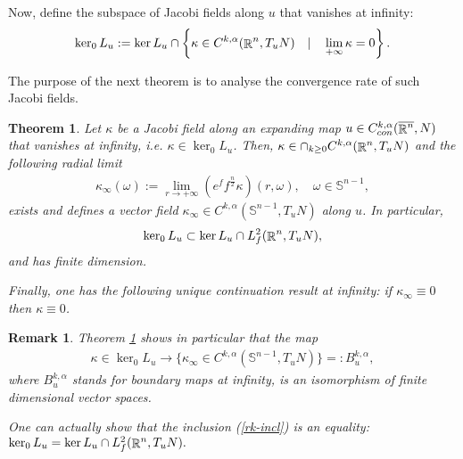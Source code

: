 \documentclass[a4paper,11pt,reqno]{amsart}
\newtheorem{theo}[defn]{Theorem}
\newtheorem{rk}[defn]{Remark}
\def\R{\mathop{\rm \mathbb{R}}\nolimits}
\newcommand{\Sp}{\mathbb{S}}
\begin{document}
 Now, define the subspace of Jacobi fields along $u$ that vanishes at infinity:
\begin{eqnarray*}
\ker_0L_u:=\ker L_u\cap \left\{\kappa\in C^{k,\alpha}(\R^n,T_uN)\quad|\quad \lim_{+\infty}\kappa=0\right\}.
\end{eqnarray*}

The purpose of the next theorem is to analyse the convergence rate of such Jacobi fields.

\begin{theo}\label{Analysis-Jacobi-field}
Let $\kappa$ be a Jacobi field along an expanding map $u\in C_{con}^{k,\alpha}(\overline{\R^n},N)$ that vanishes at infinity, i.e. $\kappa\in \ker_0L_u$. Then, 
$\kappa \in \cap_{k\geq 0}C^{k,\alpha}(\R^n,T_uN)$ and the following radial limit
\begin{eqnarray*}
\kappa_{\infty}(\omega):=\lim_{r\rightarrow+\infty}\left(e^f f^{\frac{n}{2}}\kappa\right)(r,\omega),\quad\omega\in \Sp^{n-1},
\end{eqnarray*}
exists and defines a vector field $\kappa_{\infty}\in C^{k,\alpha}(\Sp^{n-1},T_uN)$ along $u$. In particular, 
\begin{eqnarray}
\ker_0L_u\subset\ker L_u\cap L^2_f(\R^n,T_uN),\label{rk-incl}
\end{eqnarray}
 and has finite dimension.

Finally, one has the following unique continuation result at infinity: if $\kappa_{\infty}\equiv 0$ then $\kappa\equiv0$. 
\end{theo}

\begin{rk}\label{rk-bdy-map-jac-field}
Theorem \ref{Analysis-Jacobi-field} shows in particular that the map 
\begin{eqnarray}
\kappa\in \ker_0 L_u\rightarrow \{\kappa_{\infty}\in C^{k,\alpha}(\Sp^{n-1},T_uN)\}=:B_u^{k,\alpha},
\end{eqnarray}
where $B_u^{k,\alpha}$ stands for boundary maps at infinity,
 is an isomorphism of finite dimensional vector spaces. 

One can actually show that the inclusion (\ref{rk-incl}) is an equality: $\ker_0L_u=\ker L_u\cap L^2_f(\R^n,T_uN).$
\end{rk}
\end{document}
